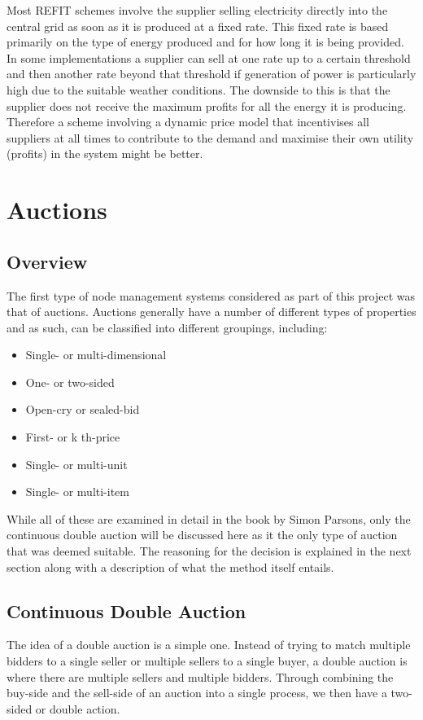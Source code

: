 \documentclass[a4paper, notitlepage]{report}
\begin{document}
Most REFIT schemes involve the supplier selling electricity directly into the
central grid as soon as it is produced at a fixed rate. This fixed rate is based
primarily on the type of energy produced and for how long it is being provided.
In some implementations a supplier can sell at one rate up to a certain
threshold and then another rate beyond that threshold if generation of power is
particularly high due to the suitable weather conditions. The downside to this
is that the supplier does not receive the maximum profits for all the energy it
is producing. Therefore a scheme involving a dynamic price model that incentivises
all suppliers at all times to contribute to the demand and maximise their own
utility (profits) in the system might be better.
\chapter{Auctions}
\label{sec:orgc402939}
\section{Overview}
\label{sec:orgaf73482}
The first type of node management systems considered as part of this project was
that of auctions. Auctions generally have a number of different types of
properties \cite{parsons2011auctions} and as such, can be classified into
different groupings, including: 

\begin{itemize}
\item Single- or multi-dimensional
\item One- or two-sided
\item Open-cry or sealed-bid
\item First- or k th-price
\item Single- or multi-unit
\item Single- or multi-item
\end{itemize}

While all of these are examined in detail in the book by Simon Parsons, only the
continuous double auction will be discussed here as it the only type of auction
that was deemed suitable. The reasoning for the decision is explained in the
next section along with a description of what the method itself entails.
\section{Continuous Double Auction}
\label{sec:orgc38702f}
The idea of a double auction is a simple one. Instead of trying to match
multiple bidders to a single seller or multiple sellers to a single buyer, a
double auction is where there are multiple sellers and multiple bidders. Through
combining the buy-side and the sell-side of an auction into a single process, we
then have a two-sided or double action. 
\end{document}
